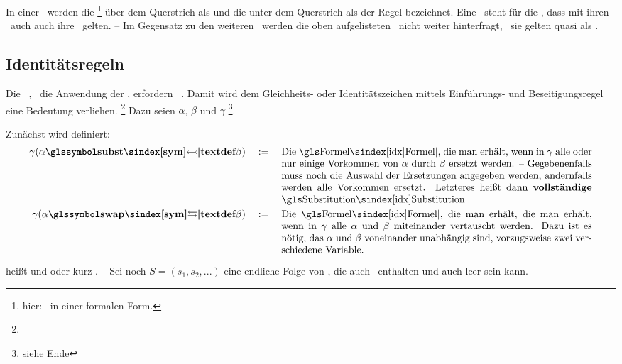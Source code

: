 {In einer \Schlussregel\ werden die \Formeln%
\footnote{hier: \Aussagen\ in einer formalen Form.}
über dem Querstrich als  und die unter dem Querstrich als  der Regel bezeichnet.
Eine \Schlussregel\ steht für die \Aussage, dass mit ihren \Voraussetzungen\ auch auch ihre \Folgerungen\ gelten.
-- Im Gegensatz zu den weiteren \Schlussregeln\ werden die oben aufgelisteten \Basisregeln\ nicht weiter hinterfragt, \textdh\ sie gelten quasi als \Axiome.

\subsection{Identitätsregeln}%
\label{sub:Identitätsregeln}

Die \zulaessigen\ \Transformationen, \textdh\ die Anwendung der \Schlussregeln, erfordern \zulaessige\ \Substitutionen.
Damit wird dem Gleichheits- oder Identitätszeichen \chrqt{\symeq} mittels Einführungs- und Beseitigungsregel eine Bedeutung verliehen.%
\footnote{}
Dazu seien $\alpha$, $\beta$ und $\gamma$ \vergleichbare\footnote{siehe Ende }\Formeln.

Zunächst wird definiert:
\begin{align}
	\gamma(\alpha \definition{\symsubst} \beta) \quad \defeq \quad
	\parbox[t]{11cm}{%
		Die \Formel, die man erhält, wenn in $\gamma$ alle oder nur einige Vorkommen von $\alpha$ durch $\beta$ ersetzt werden.
		-- Gegebenenfalls muss noch die Auswahl der Ersetzungen angegeben werden, andernfalls werden alle Vorkommen ersetzt.
		Letzteres heißt dann \defn{vollständige} \Substitution.
	} \label{def:SubstitutionAlt}\\
	\gamma(\alpha \definition{\symswap} \beta) \quad \defeq \quad
	\parbox[t]{11cm}{%
		Die \Formel, die man erhält, die man erhält, wenn in $\gamma$ alle $\alpha$ und $\beta$ miteinander vertauscht werden.
		Dazu ist es nötig, das $\alpha$ und $\beta$ voneinander unabhängig sind, vorzugsweise zwei verschiedene Variable.
	} \label{def:Vertauschung}
\end{align}

\seqqt{$ \alpha \symsubst \beta $} heißt  und \seqqt{$ \alpha \symswap \beta $}  oder kurz .
-- Sei noch $S = (s_1, s_2, ...)$ eine endliche Folge von \Substitutionen, die auch \Vertauschungen\ enthalten und auch leer sein kann.

}
